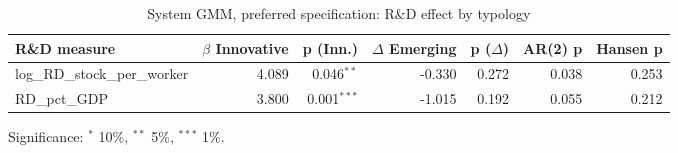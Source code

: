 \begin{table}[htbp]
\centering\small
\caption{System GMM, preferred specification: R\&D effect by typology}
\label{tab:gmmhet}
\begin{tabular}{lrrrrrr}
\toprule
R\&D measure & $\beta$ Innovative & p (Inn.) & $\Delta$ Emerging & p ($\Delta$) & AR(2) p & Hansen p \\
\midrule
log\_RD\_stock\_per\_worker & 4.089 & 0.046$^{**}$ & -0.330 & 0.272 & 0.038 & 0.253 \\
RD\_pct\_GDP & 3.800 & 0.001$^{***}$ & -1.015 & 0.192 & 0.055 & 0.212 \\
\bottomrule
\end{tabular}
\par\footnotesize Significance: $^{*}$ 10\%, $^{**}$ 5\%, $^{***}$ 1\%.
\end{table}
